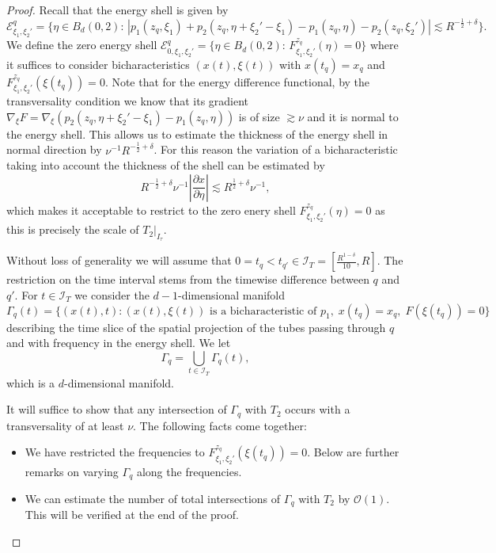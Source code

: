 \documentclass{amsart}
\theoremstyle{definition}
\begin{document}
\begin{proof}

Recall that the energy shell is given by
\begin{equation*}
\mathcal{E}^{q}_{\xi_1,\xi_2'} = \{ \eta \in B_d(0,2) : \, |p_1(z_q,\xi_1) + p_2(z_q,\eta +\xi_2'-\xi_1) - p_1(z_q,\eta) - p_2(z_q,\xi_2') | \lesssim R^{-\frac{1}{2}+\delta} \}.
\end{equation*}
We define the zero energy shell  $\mathcal{E}^{q}_{0,\xi_1,\xi_2'} = \{ \eta \in B_d(0,2) : \, F^{z_q}_{\xi_1,\xi_2'}(\eta) = 0 \}$ where it suffices to consider bicharacteristics $(x(t),\xi(t))$ with $x(t_q) = x_q$ and $F^{z_q}_{\xi_1,\xi_2'}(\xi(t_q)) = 0$. Note that for the energy difference functional, 
by the transversality condition we know that its gradient $\nabla_{\xi} F = \nabla_{\xi} ( p_2(z_q,\eta + \xi_2'-\xi_1) - p_1(z_q,\eta) )$ is of size $\gtrsim \nu$ and it is normal to the energy shell. This allows us to estimate the thickness of the energy shell in normal direction by $\nu^{-1} R^{-\frac{1}{2}+\delta}$. For this reason the variation of a bicharacteristic taking into account the thickness of the shell can be estimated by
\begin{equation}
\label{eq:VariationLevelSets}
R^{-\frac{1}{2}+\delta} \nu^{-1} | \frac{\partial x}{\partial \eta} | \lesssim R^{\frac{1}{2} + \delta } \nu^{-1},
\end{equation}
which makes it acceptable to restrict to the zero enery shell $F^{z_q}_{\xi_1,\xi_2'}(\eta) = 0$ as this is precisely the scale of $T_2 \big\vert_{I_{\tau}}$.

Without loss of generality
we will assume  that $0= t_q < t_{q'} \in \mathcal{I}_T = [\frac{R^{1-\delta}}{10},R]$. The restriction on the time interval stems from the timewise difference between $q$ and $q'$. 
 For $t \in \mathcal{I}_T$ we consider the $d-1$-dimensional manifold
\begin{equation*}
\Gamma_{q}(t) = \{ (x(t),t) : (x(t),\xi(t)) \text{ is a bicharacteristic of } p_1, \; x(t_q) = x_q, \; F(\xi(t_q)) = 0 \}
\end{equation*}
describing the time slice of the spatial projection of the tubes passing through $q$ and with frequency in the energy shell. We let
\begin{equation*}
\Gamma_{q} = \bigcup_{t \in \mathcal{I}_T} \Gamma_{q}(t),
\end{equation*}
which is a $d$-dimensional manifold.

It will suffice to show that any intersection of $\Gamma_q$ with $T_2$ occurs with a transversality of at least $\nu$. The following facts come together:
\begin{itemize}
\item We have restricted the frequencies to $F^{z_q}_{\xi_1,\xi_2'}(\xi(t_q)) = 0$. 
Below are further remarks on varying $\Gamma_q$ along the frequencies.
\item We can estimate the number of total intersections of $\Gamma_q$ with $T_2$ by $\mathcal{O}(1)$. This will be verified at the end of the proof.
\end{itemize}


\end{proof}
\end{document}
